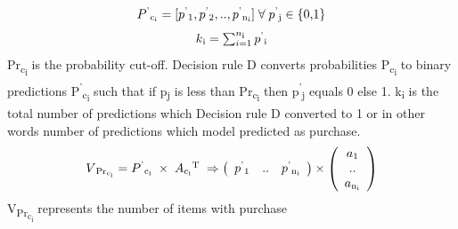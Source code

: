   \begin{equation}
    \begin{array}{l}
      P\textsuperscript{'}\textsubscript{c\textsubscript{i}} = [p\textsuperscript{'}\textsubscript{1}, 
      p\textsuperscript{'}\textsubscript{2}, .., p\textsuperscript{'}\textsubscript{n\textsubscript{i}}]\; 
      \forall \; p\textsuperscript{'}\textsubscript{j} \in \; $\{0,1\}$
    \end{array}
    \label{eqn:Pdash}
  \end{equation}
  \begin{equation}
    \begin{array}{l}
      k\textsubscript{i} =\sum_{i=1}^{n\textsubscript{i}}p\textsuperscript{'}\textsubscript{i}
    \end{array}
    \label{eqn:Pdash}
  \end{equation}
Pr\textsubscript{c\textsubscript{i}} is the probability cut-off.
Decision rule D converts probabilities P\textsubscript{c\textsubscript{i}} to binary predictions 
P\textsuperscript{'}\textsubscript{c\textsubscript{i}} such that if p\textsubscript{j} is less than 
Pr\textsubscript{c\textsubscript{i}} then p\textsuperscript{'}\textsubscript{j} equals 0 else 1. 
k\textsubscript{i} is the total number of predictions which Decision rule D converted to 1 or in other words
number of predictions which model predicted as purchase.
  \begin{equation}
    \begin{array}{l}
      V\textsubscript{Pr\textsubscript{c\textsubscript{i}}} = 
      P\textsuperscript{'}\textsubscript{c\textsubscript{i}}
      \;\times\; A\textsubscript{c\textsubscript{i}}\textsuperscript{T}
      \;
      \Rightarrow	
      \left( \begin{array}{ccc}
      p\textsuperscript{'}\textsubscript{1} & .. & 
      p\textsuperscript{'}\textsubscript{n\textsubscript{i}}
      \end{array} \right)
      \times
      \left( \begin{array}{ccc}
      a\textsubscript{1} \\
      .. \\
      a\textsubscript{n\textsubscript{i}} \\
      \end{array} \right)
    \end{array}
    \label{eqn:probability}
  \end{equation}
V\textsubscript{Pr\textsubscript{c\textsubscript{i}}} represents the number of items with purchase 

